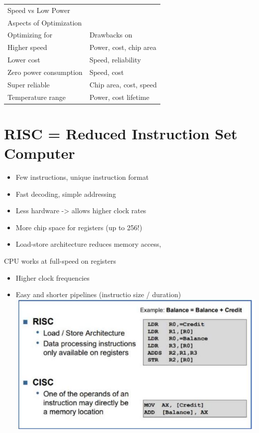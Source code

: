 \documentclass[10pt]{article}
\begin{document}
\begin{center}
\begin{tabular}{|l|l|}
\hline
Speed vs Low Power &  \\
Aspects of Optimization &  \\
\hline
Optimizing for & Drawbacks on \\
\hline
Higher speed & Power, cost, chip area \\
\hline
Lower cost & Speed, reliability \\
\hline
Zero power consumption & Speed, cost \\
\hline
Super reliable & Chip area, cost, speed \\
\hline
Temperature range & Power, cost lifetime \\
\hline
\end{tabular}
\end{center}

\section*{RISC = Reduced Instruction Set Computer}
\begin{itemize}
  \item Few instructions, unique instruction format
  \item Fast decoding, simple addressing
  \item Less hardware -> allows higher clock rates
  \item More chip space for registers (up to 256!)
  \item Load-store architecture reduces memory access,
\end{itemize}

CPU works at full-speed on registers

\begin{itemize}
  \item Higher clock frequencies
  \item Easy and shorter pipelines (instructio size / duration)\\
\includegraphics[width=\linewidth]{images/2024_12_29_79e6b22f503fb7b4f718g-13(1)}
\end{itemize}
\end{document}
